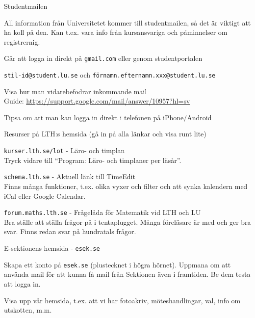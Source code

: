 \documentclass[10pt]{article}
\begin{document}
\begin{dashlist}
		\item Studentmailen
		\begin{dashlist}
			\item All information från Universitetet kommer till studentmailen, så det är viktigt att ha koll på den. Kan t.ex. vara info från kursansvariga och påminnelser om registrernig.
			\item Går att logga in direkt på \texttt{gmail.com} eller genom studentportalen
			\item \texttt{stil-id@student.lu.se} och \texttt{förnamn.efternamn.xxx@student.lu.se}
			\item Visa hur man vidarebefodrar inkommande mail\\
			Guide: \url{https://support.google.com/mail/answer/10957?hl=sv}
			\item Tipsa om att man kan logga in direkt i telefonen på iPhone/Android
		\end{dashlist}

		\newpage

		\item Resurser på LTH:s hemsida (gå in på alla länkar och visa runt lite)
		\begin{dashlist}
			\item \texttt{kurser.lth.se/lot} - Läro- och timplan\\
				Tryck vidare till ``Program: Läro- och timplaner per läsår''.
			\item \texttt{schema.lth.se} - Aktuell länk till TimeEdit\\
				Finns många funktioner, t.ex. olika vyxer och filter och att synka kalendern med iCal eller Google Calendar.
			\item \texttt{forum.maths.lth.se} - Frågelåda för Matematik vid LTH och LU\\
				Bra ställe att ställa frågor på i tentaplugget. Många föreläsare är med och ger bra svar. Finns redan svar på hundratals frågor.
		\end{dashlist}

		\item E-sektionens hemsida - \texttt{esek.se}
		\begin{dashlist}
			\item Skapa ett konto på \texttt{esek.se} (plustecknet i högra hörnet). Uppmana om att använda mail för att kunna få mail från Sektionen även i framtiden. Be dem testa att logga in.
			\item Visa upp vår hemsida, t.ex. att vi har fotoakriv, möteshandlingar, val, info om utskotten, m.m.
		\end{dashlist}


\end{dashlist}
\end{document}
